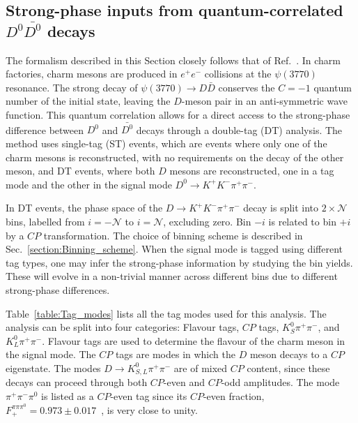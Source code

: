 \documentclass[12pt, a4paper, notitlepage, onecolumn]{article}
\begin{document}
\subsection{Strong-phase inputs from quantum-correlated \texorpdfstring{$D^0\bar{D^0}$}{DD} decays}
\noindent The formalism described in this Section closely follows that of Ref.~\cite{HarnewS4pi}. In charm factories, charm mesons are produced in $e^+e^-$ collisions at the $\psi(3770)$ resonance. The strong decay of $\psi(3770)\to D\bar{D}$ conserves the $C = -1$ quantum number of the initial state, leaving the $D$-meson pair in an anti-symmetric wave function. This quantum correlation allows for a direct access to the strong-phase difference between $D^0$ and $\bar{D^0}$ decays through a double-tag (DT) analysis. The method uses single-tag (ST) events, which are events where only one of the charm mesons is reconstructed, with no requirements on the decay of the other meson, and DT events, where both $D$ mesons are reconstructed, one in a tag mode and the other in the signal mode $D^0\to K^+K^-\pi^+\pi^-$.

In DT events, the phase space of the $D\to K^+K^-\pi^+\pi^-$ decay is split into $2\times\mathcal{N}$ bins, labelled from $i = -\mathcal{N}$ to $i = \mathcal{N}$, excluding zero. Bin $-i$ is related to bin $+i$ by a $C\!P$ transformation. The choice of binning scheme is described in Sec.~\ref{section:Binning_scheme}. When the signal mode is tagged using different tag types, one may infer the strong-phase information by studying the bin yields. These will evolve in a non-trivial manner across different bins due to different strong-phase differences.

Table~\ref{table:Tag_modes} lists all the tag modes used for this analysis. The analysis can be split into four categories: Flavour tags, $C\!P$ tags, $K_S^0\pi^+\pi^-$, and $K_L^0\pi^+\pi^-$. Flavour tags are used to determine the flavour of the charm meson in the signal mode. The $C\!P$ tags are modes in which the $D$ meson decays to a $C\!P$ eigenstate. The modes $D\to K_{S, L}^0\pi^+\pi^-$ are of mixed $C\!P$ content, since these decays can proceed through both $C\!P$-even and $C\!P$-odd amplitudes. The mode $\pi^+\pi^-\pi^0$ is listed as a $C\!P$-even tag since its $C\!P$-even fraction, $F_+^{\pi\pi\pi^0} = 0.973 \pm 0.017$~\cite{cite:pipipi0_CPfraction}, is very close to unity.
\end{document}

